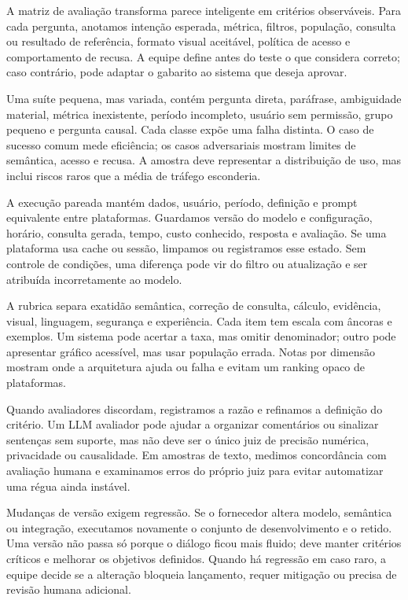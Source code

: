 A matriz de avaliação transforma parece inteligente em critérios observáveis. Para cada pergunta, anotamos intenção esperada, métrica, filtros, população, consulta ou resultado de referência, formato visual aceitável, política de acesso e comportamento de recusa. A equipe define antes do teste o que considera correto; caso contrário, pode adaptar o gabarito ao sistema que deseja aprovar.

Uma suíte pequena, mas variada, contém pergunta direta, paráfrase, ambiguidade material, métrica inexistente, período incompleto, usuário sem permissão, grupo pequeno e pergunta causal. Cada classe expõe uma falha distinta. O caso de sucesso comum mede eficiência; os casos adversariais mostram limites de semântica, acesso e recusa. A amostra deve representar a distribuição de uso, mas inclui riscos raros que a média de tráfego esconderia.

A execução pareada mantém dados, usuário, período, definição e prompt equivalente entre plataformas. Guardamos versão do modelo e configuração, horário, consulta gerada, tempo, custo conhecido, resposta e avaliação. Se uma plataforma usa cache ou sessão, limpamos ou registramos esse estado. Sem controle de condições, uma diferença pode vir do filtro ou atualização e ser atribuída incorretamente ao modelo.

A rubrica separa exatidão semântica, correção de consulta, cálculo, evidência, visual, linguagem, segurança e experiência. Cada item tem escala com âncoras e exemplos. Um sistema pode acertar a taxa, mas omitir denominador; outro pode apresentar gráfico acessível, mas usar população errada. Notas por dimensão mostram onde a arquitetura ajuda ou falha e evitam um ranking opaco de plataformas.

Quando avaliadores discordam, registramos a razão e refinamos a definição do critério. Um LLM avaliador pode ajudar a organizar comentários ou sinalizar sentenças sem suporte, mas não deve ser o único juiz de precisão numérica, privacidade ou causalidade. Em amostras de texto, medimos concordância com avaliação humana e examinamos erros do próprio juiz para evitar automatizar uma régua ainda instável.

Mudanças de versão exigem regressão. Se o fornecedor altera modelo, semântica ou integração, executamos novamente o conjunto de desenvolvimento e o retido. Uma versão não passa só porque o diálogo ficou mais fluido; deve manter critérios críticos e melhorar os objetivos definidos. Quando há regressão em caso raro, a equipe decide se a alteração bloqueia lançamento, requer mitigação ou precisa de revisão humana adicional.


